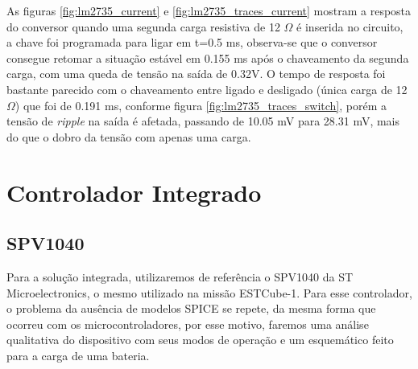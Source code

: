 As figuras \ref{fig:lm2735_current} e \ref{fig:lm2735_traces_current} mostram a resposta do conversor quando uma segunda carga resistiva de 12 $\Omega$ é inserida no circuito, a chave foi programada para ligar em t=0.5 ms, observa-se que o conversor consegue retomar a situação estável em 0.155 ms após o chaveamento da segunda carga, com uma queda de tensão na saída de 0.32V. O tempo de resposta foi bastante parecido com o chaveamento entre ligado e desligado (única carga de 12 $\Omega$) que foi de 0.191 ms, conforme figura \ref{fig:lm2735_traces_switch}, porém a tensão de \textit{ripple} na saída é afetada, passando de 10.05 mV para 28.31 mV, mais do que o dobro da tensão com apenas uma carga.

\noindent
\begin{minipage}{\linewidth}
\label{fig:lm2735_traces_switch}
\end{minipage}

\section{Controlador Integrado}

\subsection*{SPV1040}

Para a solução integrada, utilizaremos de referência o SPV1040 \cite{spv1040_datasheet} da ST Microelectronics, o mesmo utilizado na missão ESTCube-1. Para esse controlador, o problema da ausência de modelos SPICE se repete, da mesma forma que ocorreu com os microcontroladores, por esse motivo, faremos uma análise qualitativa do dispositivo com seus modos de operação e um esquemático feito para a carga de uma bateria.

